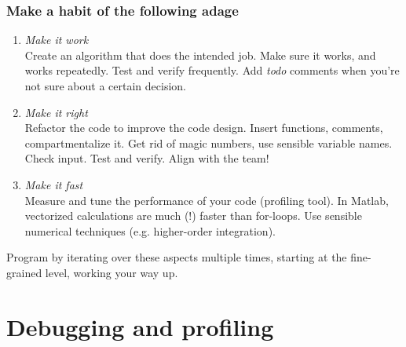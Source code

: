 \begin{frame}[fragile,label=wrf-explain]
  \frametitle{Make a habit of the following adage}
  \begin{enumerate}
     \item \emph{Make it work}\\ 
    Create an algorithm that does the intended job. Make sure it works, and works repeatedly. Test and verify frequently. Add \emph{todo} comments when you're not sure about a certain decision.
     \item \emph{Make it right}\\ 
    Refactor the code to improve the code design. Insert functions, comments, compartmentalize it. Get rid of magic numbers, use sensible variable names. Check input. Test and verify. Align with the team!
     \item \emph{Make it fast}\\ 
    Measure and tune the performance of your code (profiling tool). In Matlab, vectorized calculations are much (!) faster than for-loops. Use sensible numerical techniques (e.g. higher-order integration).
  \end{enumerate}
  Program by iterating over these aspects multiple times, starting at the fine-grained level, working your way up.
\end{frame}


\section{Debugging and profiling}
